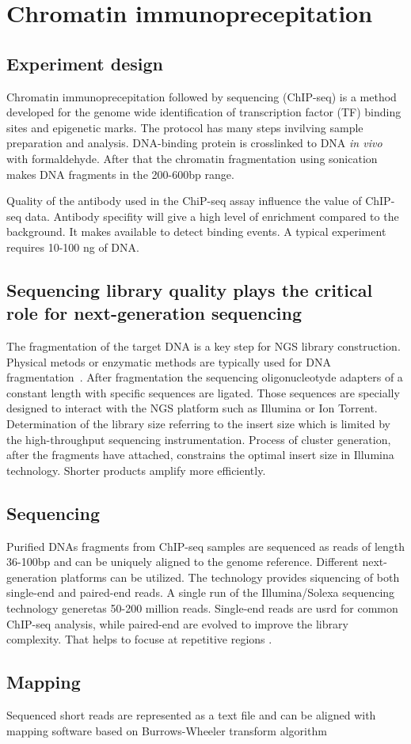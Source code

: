 \chapter{Chromatin immunoprecepitation}
\section{Experiment design}
Chromatin immunoprecepitation followed by sequencing (ChIP-seq) is a method developed for the genome wide identification of transcription factor (TF) binding sites and epigenetic marks.
The protocol has many steps invilving sample preparation and analysis.
DNA-binding protein is crosslinked to DNA \emph{in vivo} with formaldehyde.
After that the chromatin fragmentation using sonication makes DNA fragments in the 200-600bp range.

Quality of the antibody used in the ChiP-seq assay influence the value of ChIP-seq data.
Antibody specifity will give a high level of enrichment compared to the background. 
It makes available to detect binding events.
A typical experiment requires 10-100 ng of DNA.

\section{Sequencing library quality plays the critical role for next-generation sequencing}
The fragmentation of the target DNA is a key step for NGS library construction.
Physical metods or enzymatic methods are typically used for DNA fragmentation~\cite{}.
After fragmentation the sequencing oligonucleotyde adapters of a constant length with specific sequences are ligated.
Those sequences are specially designed to interact with the NGS platform such as Illumina or Ion Torrent.
Determination of the library size referring to the insert size which is limited by the high-throughput sequencing instrumentation.
Process of cluster generation, after the fragments have attached, constrains the optimal insert size in Illumina technology.
Shorter products amplify more efficiently.





\section{Sequencing}
Purified DNAs fragments from ChIP-seq samples are sequenced as reads of length 36-100bp and can be uniquely aligned to the genome reference.
Different next-generation platforms can be utilized.
The technology provides siquencing of both single-end and paired-end reads.
A single run of the Illumina/Solexa sequencing technology generetas 50-200 million reads\cite{park2009chip}.
Single-end reads are usrd for common ChIP-seq analysis, while paired-end are evolved to improve the library complexity.
That helps to focuse at repetitive regions \cite{chen2012systematic}.

\section{Mapping}
Sequenced short reads are represented as a text file and can be aligned with mapping software based on Burrows-Wheeler transform algorithm \cite{li2009fast} \cite{siren2014indexing}
